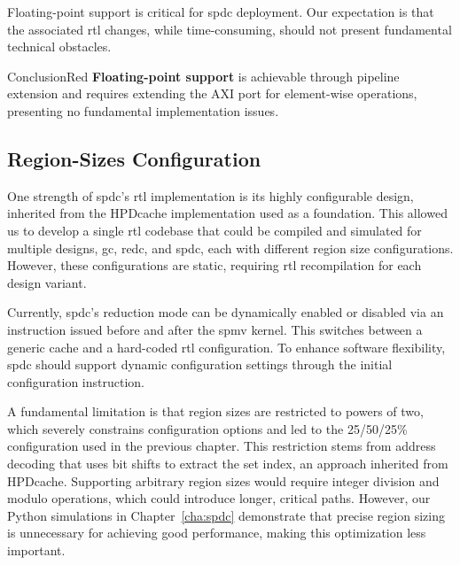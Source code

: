 Floating-point support is critical for \acrlong{spdc} deployment.
Our expectation is that the associated \acrshort{rtl} changes, while time-consuming, should not present fundamental technical obstacles.

\begin{highlight}{Conclusion}{Red}
    \textbf{Floating-point support} is achievable through \gls{pipeline} extension and requires extending the AXI port for element-wise operations, presenting no fundamental implementation issues.
\end{highlight}

\subsection{Region-Sizes Configuration}
\label{sec:optim:rtloptims:config}

One strength of \acrlong{spdc}'s \acrshort{rtl} implementation is its highly configurable design, inherited from the HPDcache implementation used as a foundation.
This allowed us to develop a single \acrshort{rtl} codebase that could be compiled and simulated for multiple designs, \acrshort{gc}, \acrshort{redc}, and \acrshort{spdc}, each with different region size configurations.
However, these configurations are static, requiring \acrshort{rtl} recompilation for each design variant.

Currently, \acrshort{spdc}'s \gls{reduction} mode can be dynamically enabled or disabled via an instruction issued before and after the \acrshort{spmv} kernel.
This switches between a generic cache and a hard-coded \acrshort{rtl} configuration.
To enhance software flexibility, \acrshort{spdc} should support dynamic configuration settings through the initial configuration instruction.

A fundamental limitation is that region sizes are restricted to powers of two, which severely constrains configuration options and led to the 25/50/25\% configuration used in the previous chapter.
This restriction stems from address decoding that uses bit shifts to extract the \gls{set} index, an approach inherited from HPDcache.
Supporting arbitrary region sizes would require integer division and modulo operations, which could introduce longer, critical paths.
However, our Python simulations in Chapter~\ref{cha:spdc} demonstrate that precise region sizing is unnecessary for achieving good performance, making this optimization less important.

